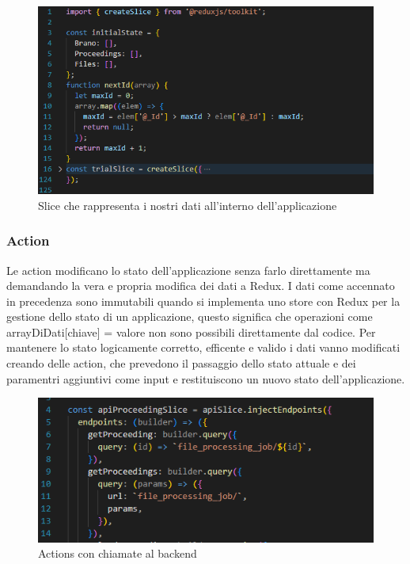 \begin{figure}[H]
  \centering
  \includegraphics[width=\textwidth]{immagini/slice-reducer.png}
  \caption{Slice che rappresenta i nostri dati all'interno dell'applicazione}
\end{figure}

\subsubsection{Action}
Le action modificano lo stato dell'applicazione senza farlo direttamente ma demandando la vera e propria modifica dei dati a Redux. I dati come accennato in precedenza sono immutabili
quando si implementa uno store con Redux per la gestione dello stato di un applicazione, questo significa che operazioni come arrayDiDati[chiave] = valore non sono possibili
direttamente dal codice. Per mantenere lo stato logicamente corretto, efficente e valido i dati vanno modificati creando delle action, che prevedono il passaggio dello stato attuale
e dei paramentri aggiuntivi come input e restituiscono un nuovo stato dell'applicazione.

\begin{figure}[H]
  \centering
  \includegraphics[width=\textwidth]{immagini/api-action.png}
  \caption{Actions con chiamate al backend}
\end{figure}

